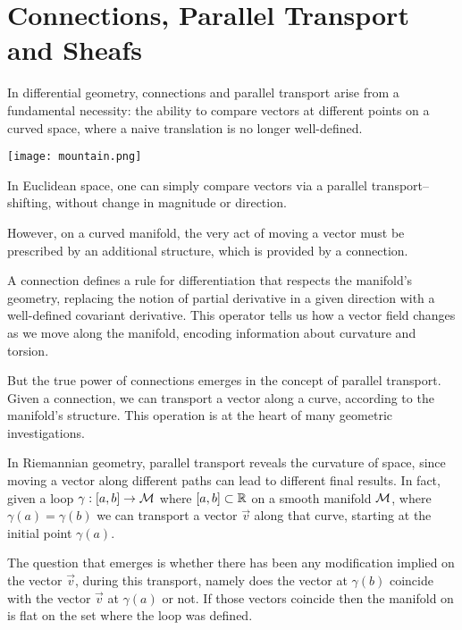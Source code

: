 
\chapter{Connections, Parallel Transport and Sheafs} 

In differential geometry, connections and parallel transport arise from a fundamental necessity: the ability to compare vectors at different points on a curved space, where a naive translation is no longer well-defined.

\begin{minipage}{0.5\textwidth} 
  \centering
  \texttt{[image: mountain.png]}

\end{minipage}

In Euclidean space, one can simply
compare vectors via a parallel transport--shifting,
without change in magnitude or direction.

However, on a curved manifold, the very act of moving a vector must be prescribed by an additional structure, which is provided by a connection.

A connection defines a rule for differentiation that respects the manifold’s geometry, replacing the notion of partial derivative in a given direction with a well-defined covariant derivative. This operator tells us how a vector field changes as we move along the manifold, encoding information about curvature and torsion.

But the true power of connections emerges in the concept of parallel transport. Given a connection, we can transport a vector along a curve, according to the manifold’s structure. This operation is at the heart of many geometric investigations.

In Riemannian geometry, parallel transport reveals the curvature of space, since moving a vector along different paths can lead to different final results. In fact, given a loop $\gamma:[a,b]\to \mathcal{M}$ where $[a,b]\subset \mathbb{R}$ on a smooth manifold $\mathcal{M}$, where $\gamma(a)=\gamma(b)$ we can transport a vector $\Vec{v}$ along that curve,  starting at the initial point $\gamma(a)$. 

The question that emerges is whether there has been any modification implied on the vector $\Vec{v}$, during this transport, namely does the vector at $\gamma(b)$ coincide with the vector $\Vec{v}$ at $\gamma(a)$ or not. If those vectors coincide then the manifold on is flat on the set where the loop was defined.



